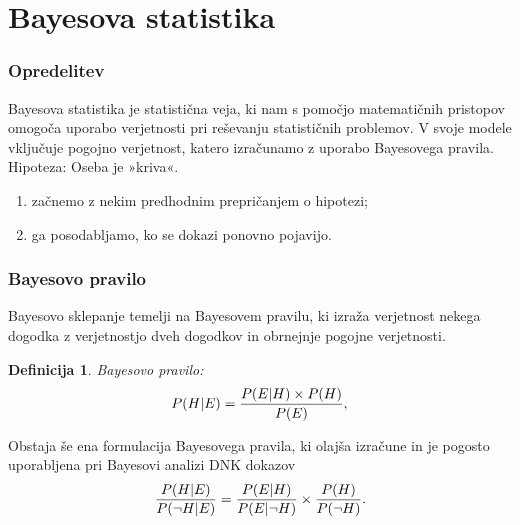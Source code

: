 \documentclass{beamer}
\newtheorem{definicija}{Definicija}
\begin{document}
\section{Bayesova statistika}

\begin{frame}
    \frametitle{Opredelitev}
    Bayesova statistika je statistična veja, ki nam s pomočjo matematičnih pristopov omogoča uporabo verjetnosti pri reševanju statističnih 
    problemov. V svoje modele vključuje pogojno verjetnost, katero izračunamo z uporabo Bayesovega pravila. \\ \vspace{3mm}
    Hipoteza: Oseba je »kriva«.
    \begin{enumerate}
        \item začnemo z nekim predhodnim prepričanjem o hipotezi;
        \item ga posodabljamo, ko se dokazi ponovno pojavijo.
    \end{enumerate}
\end{frame}


\begin{frame}
    \frametitle{Bayesovo pravilo}
    Bayesovo sklepanje temelji na Bayesovem pravilu, ki izraža verjetnost nekega dogodka z verjetnostjo dveh dogodkov in obrnejnje pogojne
    verjetnosti. \vspace{3mm}
    \begin{definicija}
        Bayesovo pravilo:
        \[
            P(H \lvert E) = \frac{P(E \lvert H) \times P(H)}{P(E)}, \vspace{2mm}
        \] 
    \end{definicija} \vspace{3mm}
    Obstaja še ena formulacija Bayesovega pravila, ki olajša izračune in je pogosto uporabljena pri Bayesovi analizi DNK dokazov
    \[
        \frac{P(H \lvert E)}{P(\neg H \lvert E)} = \frac{P(E \lvert H)}{P(E \lvert \neg H)} \times \frac{P(H)}{P(\neg H)}. \vspace{2mm}
    \]
\end{frame}
\end{document}
